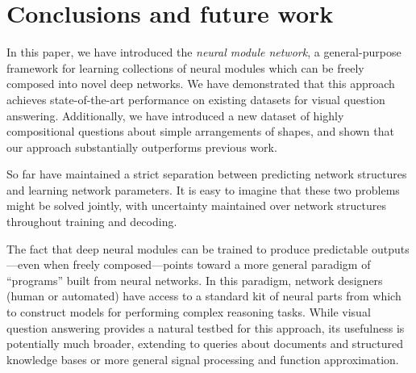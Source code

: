 \documentclass[10pt,twocolumn,letterpaper]{article}
\begin{document}
\section{Conclusions and future work}

In this paper, we have introduced the \emph{neural module network}, a general-purpose framework for learning collections of neural modules which can be freely composed into novel deep networks. We have demonstrated that this approach achieves state-of-the-art performance on existing datasets for visual question answering. Additionally, we have introduced a new dataset of highly compositional questions about simple arrangements of shapes, and shown that our approach substantially outperforms previous work.

So far have maintained a strict separation between predicting network
structures and learning network parameters. It is easy to imagine that these two
problems might be solved jointly, with uncertainty maintained over network
structures throughout training and decoding.

The fact that deep neural modules can be trained to produce predictable
outputs---even when freely composed---points toward a more general paradigm of
``programs'' built from neural networks. In this paradigm, network designers
(human or automated) have access to a standard kit of neural parts from which to
construct models for performing complex reasoning tasks. While visual question
answering provides a natural testbed for this approach, its usefulness is
potentially much broader, extending to queries about documents and structured
knowledge bases or more general signal processing and function approximation.

{\small


}
\end{document}
